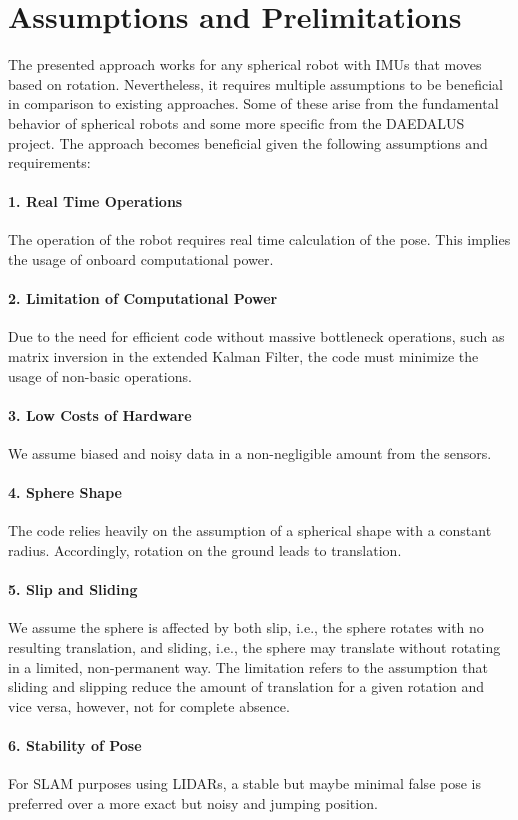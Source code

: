 \documentclass[letterpaper, 10 pt, conference]{ieeeconf}  %
\begin{document}
\section{Assumptions and Prelimitations}
\label{sec:AssumptionsAndPrelimitations}
The presented approach works for any spherical robot with IMUs that moves based on rotation.
Nevertheless, it requires multiple assumptions to be beneficial in comparison to existing approaches.
Some of these arise from the fundamental behavior of spherical robots and some more specific from the DAEDALUS project.
The approach becomes beneficial given the following assumptions and requirements:

\paragraph*{1. Real Time Operations}The operation of the robot requires real time calculation of the pose. This implies the usage of onboard computational power.
\paragraph*{2. Limitation of Computational Power}
Due to the need for efficient code without massive bottleneck operations, such as matrix inversion in the extended Kalman Filter, the code must minimize the usage of non-basic operations.
\paragraph*{3. Low Costs of Hardware}
We assume biased and noisy data in a non-negligible amount from the sensors.
\paragraph*{4. Sphere Shape}
The code relies heavily on the assumption of a spherical shape with a constant radius. Accordingly, rotation on the ground leads to translation.
\paragraph*{5. Slip and Sliding}
We assume the sphere is affected by both slip, i.e., the sphere rotates with no resulting translation, and sliding, i.e., the sphere may translate without rotating in a limited, non-permanent way. The limitation refers to the assumption that sliding and slipping reduce the amount of translation for a given rotation and vice versa, however, not for complete absence.
\paragraph*{6. Stability of Pose}
For SLAM purposes using LIDARs, a stable but maybe minimal false pose is preferred over a more exact but noisy and jumping position.
\end{document}
